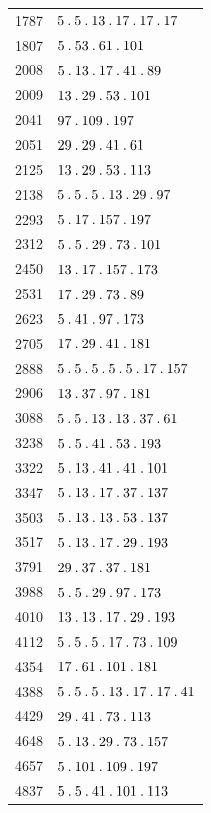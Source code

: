 \begin{longtable}{@{}r|l@{}}
1787 & $5\mathbin{.} 5\mathbin{.} 13\mathbin{.} 17\mathbin{.} 17\mathbin{.} 17$\\
1807 & $5\mathbin{.} 53\mathbin{.} 61\mathbin{.} 101$\\
2008 & $5\mathbin{.} 13\mathbin{.} 17\mathbin{.} 41\mathbin{.} 89$\\
2009 & $13\mathbin{.} 29\mathbin{.} 53\mathbin{.} 101$\\
2041 & $97\mathbin{.} 109\mathbin{.} 197$\\
2051 & $29\mathbin{.} 29\mathbin{.} 41\mathbin{.} 61$\\
2125 & $13\mathbin{.} 29\mathbin{.} 53\mathbin{.} 113$\\
2138 & $5\mathbin{.} 5\mathbin{.} 5\mathbin{.} 13\mathbin{.} 29\mathbin{.} 97$\\
2293 & $5\mathbin{.} 17\mathbin{.} 157\mathbin{.} 197$\\
2312 & $5\mathbin{.} 5\mathbin{.} 29\mathbin{.} 73\mathbin{.} 101$\\
2450 & $13\mathbin{.} 17\mathbin{.} 157\mathbin{.} 173$\\
2531 & $17\mathbin{.} 29\mathbin{.} 73\mathbin{.} 89$\\
2623 & $5\mathbin{.} 41\mathbin{.} 97\mathbin{.} 173$\\
2705 & $17\mathbin{.} 29\mathbin{.} 41\mathbin{.} 181$\\
2888 & $5\mathbin{.} 5\mathbin{.} 5\mathbin{.} 5\mathbin{.} 5\mathbin{.} 17\mathbin{.} 157$\\
2906 & $13\mathbin{.} 37\mathbin{.} 97\mathbin{.} 181$\\
3088 & $5\mathbin{.} 5\mathbin{.} 13\mathbin{.} 13\mathbin{.} 37\mathbin{.} 61$\\
3238 & $5\mathbin{.} 5\mathbin{.} 41\mathbin{.} 53\mathbin{.} 193$\\
3322 & $5\mathbin{.} 13\mathbin{.} 41\mathbin{.} 41\mathbin{.} 101$\\
3347 & $5\mathbin{.} 13\mathbin{.} 17\mathbin{.} 37\mathbin{.} 137$\\
3503 & $5\mathbin{.} 13\mathbin{.} 13\mathbin{.} 53\mathbin{.} 137$\\
3517 & $5\mathbin{.} 13\mathbin{.} 17\mathbin{.} 29\mathbin{.} 193$\\
3791 & $29\mathbin{.} 37\mathbin{.} 37\mathbin{.} 181$\\
3988 & $5\mathbin{.} 5\mathbin{.} 29\mathbin{.} 97\mathbin{.} 173$\\
4010 & $13\mathbin{.} 13\mathbin{.} 17\mathbin{.} 29\mathbin{.} 193$\\
4112 & $5\mathbin{.} 5\mathbin{.} 5\mathbin{.} 17\mathbin{.} 73\mathbin{.} 109$\\
4354 & $17\mathbin{.} 61\mathbin{.} 101\mathbin{.} 181$\\
4388 & $5\mathbin{.} 5\mathbin{.} 5\mathbin{.} 13\mathbin{.} 17\mathbin{.} 17\mathbin{.} 41$\\
4429 & $29\mathbin{.} 41\mathbin{.} 73\mathbin{.} 113$\\
4648 & $5\mathbin{.} 13\mathbin{.} 29\mathbin{.} 73\mathbin{.} 157$\\
4657 & $5\mathbin{.} 101\mathbin{.} 109\mathbin{.} 197$\\
4837 & $5\mathbin{.} 5\mathbin{.} 41\mathbin{.} 101\mathbin{.} 113$\\

\end{longtable}
